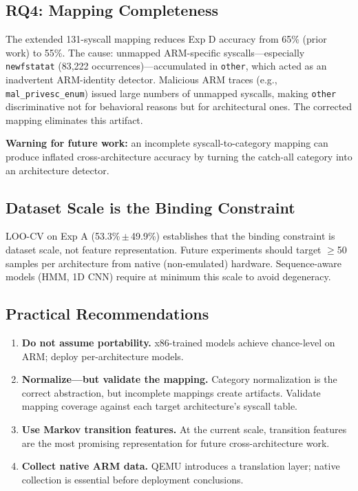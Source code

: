 \documentclass[10pt,twocolumn]{article}
\begin{document}
\subsection{RQ4: Mapping Completeness}
\label{sec:rq4}

The extended 131-syscall mapping reduces Exp D accuracy from 65\% (prior work)
to 55\%. The cause: unmapped ARM-specific syscalls---especially
\texttt{newfstatat} (83,222 occurrences)---accumulated in \texttt{other},
which acted as an inadvertent ARM-identity detector. Malicious ARM traces
(e.g., \texttt{mal\_privesc\_enum}) issued large numbers of unmapped syscalls,
making \texttt{other} discriminative not for behavioral reasons but for
architectural ones. The corrected mapping eliminates this artifact.

\textbf{Warning for future work:} an incomplete syscall-to-category mapping
can produce inflated cross-architecture accuracy by turning the catch-all
category into an architecture detector.

\subsection{Dataset Scale is the Binding Constraint}

LOO-CV on Exp A (53.3\%\,$\pm$\,49.9\%) establishes that the binding
constraint is dataset scale, not feature representation. Future experiments
should target $\geq$50 samples per architecture from native (non-emulated)
hardware. Sequence-aware models (HMM, 1D CNN) require at minimum this scale
to avoid degeneracy.

\subsection{Practical Recommendations}

\begin{enumerate}
  \item \textbf{Do not assume portability.} x86-trained models achieve
    chance-level on ARM; deploy per-architecture models.
  \item \textbf{Normalize---but validate the mapping.} Category normalization
    is the correct abstraction, but incomplete mappings create artifacts.
    Validate mapping coverage against each target architecture's syscall table.
  \item \textbf{Use Markov transition features.} At the current scale,
    transition features are the most promising representation for future
    cross-architecture work.
  \item \textbf{Collect native ARM data.} QEMU introduces a translation layer;
    native collection is essential before deployment conclusions.
\end{enumerate}
\end{document}
